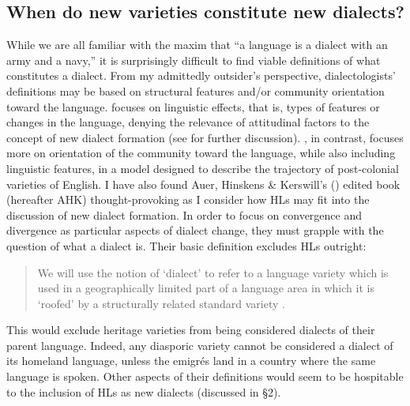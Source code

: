 \documentclass[output=paper]{LSP/langsci}
\begin{document}
\subsection{When do new varieties constitute new dialects?}
While we are all familiar with the maxim that “a language is a dialect with an army and a navy,” it is surprisingly difficult to find viable definitions of what constitutes a dialect. From my admittedly outsider’s perspective, dialectologists’ definitions may be based on structural features and/or community orientation toward the language. \citet{trudgill_dialects_1986,trudgill_new-dialect_2004} focuses on linguistic effects, that is, types of features or changes in the language, denying the relevance of attitudinal factors to the concept of new dialect formation (see \citealt[186]{meyerhoff_linguistic_2006} for further discussion). \citet{schneider_dynamics_2003, schneider_postcolonial_2007}, in contrast, focuses more on orientation of the community toward the language, while also including linguistic features, in a model designed to describe the trajectory of post-colonial varieties of English. I have also found Auer, Hinskens \& Kerswill’s (\citeyear{auer_dialect_2004}) edited book (hereafter AHK) thought-provoking as I consider how HLs may fit into the discussion of new dialect formation. In order to focus on convergence and divergence as particular aspects of dialect change, they must grapple with the question of what a dialect is. Their basic definition excludes HLs outright:

\begin{quote}
We will use the notion of ‘dialect’ to refer to a language variety which is used in a geographically limited part of a language area in which it is ‘roofed’ by a structurally related standard variety \citep[1]{auer_study_2004}.
\end{quote}

This would exclude heritage varieties from being considered dialects of their parent language. Indeed, any diasporic variety cannot be considered a dialect of its homeland language, unless the emigrés land in a country where the same language is spoken. Other aspects of their definitions would seem to be hospitable to the inclusion of HLs as new dialects (discussed in §2). 
\end{document}

